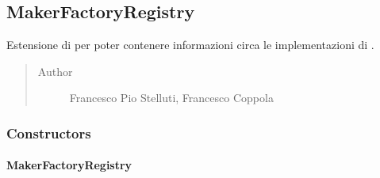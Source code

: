 \documentclass[letterpaper,10pt,italian,openany,oneside]{sphinxmanual}
\begin{document}
\subsection{MakerFactoryRegistry}
\label{\detokenize{source/it/unicam/cs/pa/mastermind/factories/MakerFactoryRegistry:makerfactoryregistry}}\label{\detokenize{source/it/unicam/cs/pa/mastermind/factories/MakerFactoryRegistry::doc}}

\begin{fulllineitems}
\label{\detokenize{source/it/unicam/cs/pa/mastermind/factories/MakerFactoryRegistry:it.unicam.cs.pa.mastermind.factories.MakerFactoryRegistry}}
Estensione di  per poter contenere informazioni circa le implementazioni di .
\begin{quote}\begin{description}
\item[{Author}] \leavevmode
Francesco Pio Stelluti, Francesco Coppola

\end{description}\end{quote}

\end{fulllineitems}



\subsubsection{Constructors}
\label{\detokenize{source/it/unicam/cs/pa/mastermind/factories/MakerFactoryRegistry:constructors}}

\paragraph{MakerFactoryRegistry}
\label{\detokenize{source/it/unicam/cs/pa/mastermind/factories/MakerFactoryRegistry:id1}}
\end{document}
